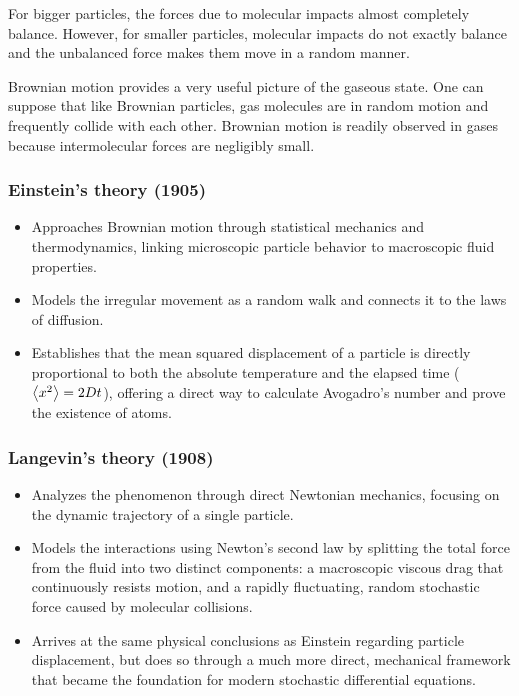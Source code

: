 		For bigger particles, the forces due to molecular impacts almost completely balance. However, for smaller particles, molecular impacts do not exactly balance and the unbalanced force makes them move in a random manner.
		
		Brownian motion provides a very useful picture of the gaseous state. One can suppose that like Brownian particles, gas molecules are in random motion and frequently collide with each other. Brownian motion is readily observed in gases because intermolecular forces are negligibly small.
		
		\subsubsection{Einstein's theory (1905)}
			\begin{itemize}
				\item Approaches Brownian motion through statistical mechanics and thermodynamics, linking microscopic particle behavior to macroscopic fluid properties.
				\item Models the irregular movement as a random walk and connects it to the laws of diffusion.
				\item Establishes that the mean squared displacement of a particle is directly proportional to both the absolute temperature and the elapsed time ($\expval{x^2}=2Dt$), offering a direct way to calculate Avogadro's number and prove the existence of atoms.
			\end{itemize}
		
		\subsubsection{Langevin's theory (1908)}
			\begin{itemize}
				\item Analyzes the phenomenon through direct Newtonian mechanics, focusing on the dynamic trajectory of a single particle.
				\item Models the interactions using Newton's second law by splitting the total force from the fluid into two distinct components: a macroscopic viscous drag that continuously resists motion, and a rapidly fluctuating, random stochastic force caused by molecular collisions.
				\item Arrives at the same physical conclusions as Einstein regarding particle displacement, but does so through a much more direct, mechanical framework that became the foundation for modern stochastic differential equations.
			\end{itemize}